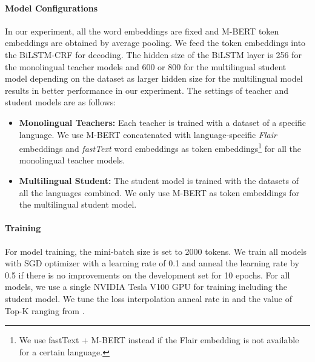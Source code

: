 \documentclass[11pt,a4paper]{article}
\begin{document}
\paragraph{Model Configurations} 
In our experiment, all the word embeddings are fixed
and M-BERT token embeddings are obtained by average pooling. We feed the token embeddings into the BiLSTM-CRF for decoding. The hidden size of the BiLSTM layer is 256 for the monolingual teacher models and 600 or 800 for the multilingual student model depending on the dataset as larger hidden size for the multilingual model results in better performance in our experiment. The settings of teacher and student models are as follows:
\begin{itemize}
\item {\bf Monolingual Teachers:} Each teacher is trained with a dataset of a specific language. We use M-BERT concatenated with language-specific \textit{Flair} \cite{akbik-etal-2018-contextual} embeddings and \textit{fastText} \cite{bojanowski2017enriching} word embeddings as token embeddings\footnote{We use fastText + M-BERT instead if the Flair embedding is not available for a certain language.} for all the monolingual teacher models. 
    \item {\bf Multilingual Student:} The student model is trained with the datasets of all the languages combined. We only use M-BERT as token embeddings for the multilingual student model. 
\end{itemize}



\paragraph{Training} For model training, the mini-batch size is set to 2000 tokens. We train all models with SGD optimizer with a learning rate of 0.1 and anneal the learning rate by 0.5 if there is no improvements on the development set for 10 epochs. For all models, we use a single NVIDIA Tesla V100 GPU for training including the student model. We tune the loss interpolation anneal rate in  and the  value of Top-K ranging from .
\end{document}
